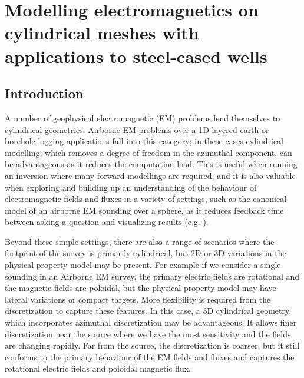 
\chapter{Modelling electromagnetics on cylindrical meshes with applications to steel-cased wells}
\label{ch:modelling_steel_cased_wells}

\section{Introduction}

A number of geophysical electromagnetic (EM) problems lend themselves to cylindrical geometries. Airborne EM problems over a 1D layered earth or borehole-logging applications fall into this category; in these cases cylindrical modelling, which removes a degree of freedom in the azimuthal component, can be advantageous as it reduces the computation load. This is useful when running an inversion where many forward modellings are required, and it  is also valuable when exploring and building up an understanding of the behaviour of electromagnetic fields and fluxes in a variety of settings, such as the canonical model of an airborne EM sounding over a sphere, as it reduces feedback time between asking a question and visualizing results (e.g. \cite{Oldenburg2017}).

Beyond these simple settings, there are also a range of scenarios where the footprint of the survey is primarily cylindrical, but 2D or 3D variations in the physical property model may be present. For example if we consider a single sounding in an Airborne EM survey, the primary electric fields are rotational and the magnetic fields are poloidal, but the physical property model may have lateral variations or compact targets. More flexibility is required from the discretization to capture these features. In this case, a 3D cylindrical geometry, which incorporates azimuthal discretization may be advantageous. It allows finer discretization near the source where we have the most sensitivity and the fields are changing rapidly. Far from the source, the discretization is coarser, but it still conforms to the primary behaviour of the EM fields and fluxes and captures the rotational electric fields and poloidal magnetic flux.


